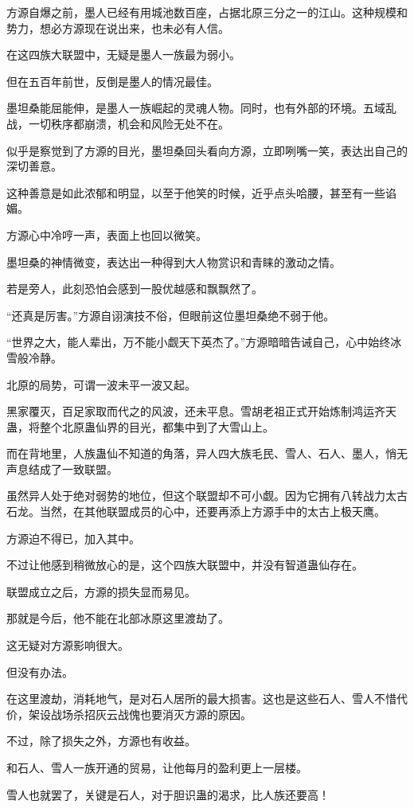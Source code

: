 \begin{this_body}
方源自爆之前，墨人已经有用城池数百座，占据北原三分之一的江山。这种规模和势力，想必方源现在说出来，也未必有人信。

在这四族大联盟中，无疑是墨人一族最为弱小。

但在五百年前世，反倒是墨人的情况最佳。

墨坦桑能屈能伸，是墨人一族崛起的灵魂人物。同时，也有外部的环境。五域乱战，一切秩序都崩溃，机会和风险无处不在。

似乎是察觉到了方源的目光，墨坦桑回头看向方源，立即咧嘴一笑，表达出自己的深切善意。

这种善意是如此浓郁和明显，以至于他笑的时候，近乎点头哈腰，甚至有一些谄媚。

方源心中冷哼一声，表面上也回以微笑。

墨坦桑的神情微变，表达出一种得到大人物赏识和青睐的激动之情。

若是旁人，此刻恐怕会感到一股优越感和飘飘然了。

“还真是厉害。”方源自诩演技不俗，但眼前这位墨坦桑绝不弱于他。

“世界之大，能人辈出，万不能小觑天下英杰了。”方源暗暗告诫自己，心中始终冰雪般冷静。

北原的局势，可谓一波未平一波又起。

黑家覆灭，百足家取而代之的风波，还未平息。雪胡老祖正式开始炼制鸿运齐天蛊，将整个北原蛊仙界的目光，都集中到了大雪山上。

而在背地里，人族蛊仙不知道的角落，异人四大族毛民、雪人、石人、墨人，悄无声息结成了一致联盟。

虽然异人处于绝对弱势的地位，但这个联盟却不可小觑。因为它拥有八转战力太古石龙。当然，在其他联盟成员的心中，还要再添上方源手中的太古上极天鹰。

方源迫不得已，加入其中。

不过让他感到稍微放心的是，这个四族大联盟中，并没有智道蛊仙存在。

联盟成立之后，方源的损失显而易见。

那就是今后，他不能在北部冰原这里渡劫了。

这无疑对方源影响很大。

但没有办法。

在这里渡劫，消耗地气，是对石人居所的最大损害。这也是这些石人、雪人不惜代价，架设战场杀招灰云战傀也要消灭方源的原因。

不过，除了损失之外，方源也有收益。

和石人、雪人一族开通的贸易，让他每月的盈利更上一层楼。

雪人也就罢了，关键是石人，对于胆识蛊的渴求，比人族还要高！


\end{this_body}
